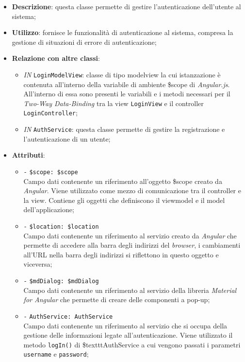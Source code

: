 \begin{itemize}
	\item \textbf{Descrizione}: questa classe permette di gestire l'autenticazione dell'utente al sistema; 
	\item \textbf{Utilizzo}: fornisce le funzionalità di autenticazione al sistema, compresa la gestione di situazioni di errore di autenticazione;
	\item \textbf{Relazione con altre classi}:
	\begin{itemize}
		\item \textit{IN} \texttt{LoginModelView}: classe di tipo modelview la cui istanzazione è contenuta all'interno della variabile di ambiente \$scope di \textit{Angular.js}. All'interno di essa sono presenti le variabili e i metodi necessari per il \textit{Two-Way Data-Binding} tra la view \texttt{LoginView} e il controller \texttt{LoginController};
		\item \textit{IN} \texttt{AuthService}: questa classe permette di gestire la registrazione e l'autenticazione di un utente;
	\end{itemize}
	\item \textbf{Attributi}:
	\begin{itemize}
		\item \texttt{-} \texttt{\$scope: \$scope} \\
		Campo dati contenente un riferimento all’oggetto \$scope creato da \textit{Angular}. Viene utilizzato come mezzo di comunicazione tra il controller e la view. Contiene gli oggetti che definiscono il viewmodel e il model dell’applicazione;
		\item \texttt{-} \texttt{\$location: \$location} \\
		Campo dati contenente un riferimento al servizio creato da \textit{Angular} che permette di accedere alla barra degli indirizzi del \textit{browser}, i cambiamenti all’URL nella barra degli indirizzi si riflettono in questo oggetto e viceversa;
		\item \texttt{-} \texttt{\$mdDialog: \$mdDialog} \\
		Campo dati contenente un riferimento al servizio della libreria \textit{Material for Angular} che permette di creare delle componenti a pop-up;
		\item \texttt{-} \texttt{AuthService: AuthService} \\
		Campo dati contenente un riferimento al servizio che si occupa della gestione delle informazioni legate all’autenticazione. Viene utilizzato il metodo \texttt{logIn()} di \$texttt{AuthService} a cui vengono passati i parametri \texttt{username} e \texttt{password};

\end{itemize}
\end{itemize}
